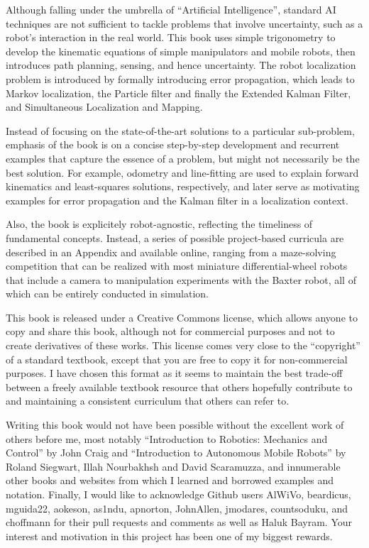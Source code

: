 \documentclass[paper=6.14in:9.21in,pagesize=pdftex,11pt,twoside,openright]{scrbook}
\begin{document}
Although falling under the umbrella of ``Artificial Intelligence'', standard AI techniques are not sufficient to tackle problems that involve uncertainty, such as a robot's interaction in the real world. This book uses simple trigonometry to develop the kinematic equations of simple manipulators and mobile robots, then introduces path planning, sensing, and hence uncertainty. The robot localization problem is introduced by formally introducing error propagation, which leads to Markov localization, the Particle filter and finally the Extended Kalman Filter, and Simultaneous Localization and Mapping.

Instead of focusing on the state-of-the-art solutions to a particular sub-problem, emphasis of the book is on a concise step-by-step development and recurrent examples that capture the essence of a problem, but might not necessarily be the best solution. For example, odometry and line-fitting are used to explain forward kinematics and least-squares solutions, respectively, and later serve as motivating examples for error propagation and the Kalman filter in a localization context.

Also, the book is explicitely robot-agnostic, reflecting the timeliness of fundamental concepts. Instead, a series of possible project-based curricula are described in an Appendix and available online, ranging from a maze-solving competition that can be realized with most miniature differential-wheel robots that include a camera to manipulation experiments with the Baxter robot, all of which can be entirely conducted in simulation.

This book is released under a Creative Commons license, which allows anyone to copy and share this book, although not for commercial purposes and not to create derivatives of these works. This license comes very close to the ``copyright'' of a standard textbook, except that you are free to copy it for non-commercial purposes. I have chosen this format as it seems to maintain the best trade-off between a freely available textbook resource that others hopefully contribute to and maintaining a consistent curriculum that others can refer to.

Writing this book would not have been possible without the excellent work of others before me, most notably ``Introduction to Robotics: Mechanics and Control'' by John Craig and ``Introduction to Autonomous Mobile Robots'' by Roland Siegwart, Illah Nourbakhsh and David Scaramuzza, and innumerable other books and websites from which I learned and borrowed examples and notation. Finally, I would like to acknowledge Github users AlWiVo, beardicus, mguida22, aokeson, as1ndu, apnorton, JohnAllen, jmodares, countsoduku, and choffmann for their pull requests and comments as well as Haluk Bayram. Your interest and motivation in this project has been one of my biggest rewards.
\end{document}
